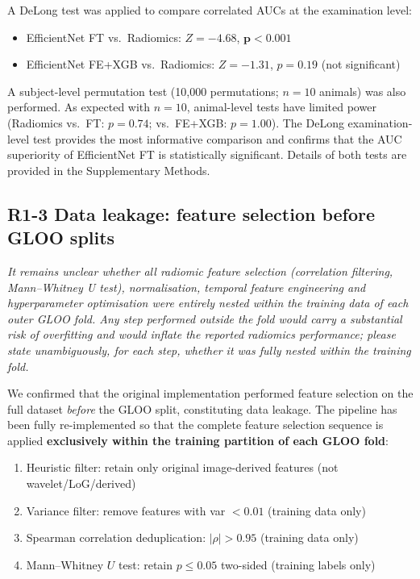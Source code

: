 \documentclass[12pt]{article}
\newcommand{\rc}[1]{\begin{reviewerbox}\itshape #1\end{reviewerbox}}
\begin{document}
A DeLong test \cite{DeLong1988} was applied to compare correlated AUCs at the examination level:
\begin{itemize}[noitemsep]
  \item EfficientNet FT vs.\ Radiomics: $Z = -4.68$, $\mathbf{p < 0.001}$
  \item EfficientNet FE+XGB vs.\ Radiomics: $Z = -1.31$, $p = 0.19$ (not significant)
\end{itemize}

A subject-level permutation test (10,000 permutations; $n=10$ animals) was also performed. As expected with $n=10$, animal-level tests have limited power (Radiomics vs.\ FT: $p=0.74$; vs.\ FE+XGB: $p=1.00$). The DeLong examination-level test provides the most informative comparison and confirms that the AUC superiority of EfficientNet FT is statistically significant. Details of both tests are provided in the Supplementary Methods.

\bigskip

\vspace{6pt}%
\subsection*{R1-3 \quad Data leakage: feature selection before GLOO splits}

\rc{It remains unclear whether all radiomic feature selection (correlation filtering, Mann–Whitney U test), normalisation, temporal feature engineering and hyperparameter optimisation were entirely nested within the training data of each outer GLOO fold. Any step performed outside the fold would carry a substantial risk of overfitting and would inflate the reported radiomics performance; please state unambiguously, for each step, whether it was fully nested within the training fold.}

We confirmed that the original implementation performed feature selection on the full dataset \emph{before} the GLOO split, constituting data leakage. The pipeline has been fully re-implemented so that the complete feature selection sequence is applied \textbf{exclusively within the training partition of each GLOO fold}:

\begin{enumerate}[noitemsep]
  \item Heuristic filter: retain only original image-derived features (not wavelet/LoG/derived)
  \item Variance filter: remove features with var $<0.01$ (training data only)
  \item Spearman correlation deduplication: $|\rho| > 0.95$ (training data only)
  \item Mann--Whitney $U$ test: retain $p \leq 0.05$ two-sided (training labels only)
\end{enumerate}
\end{document}
